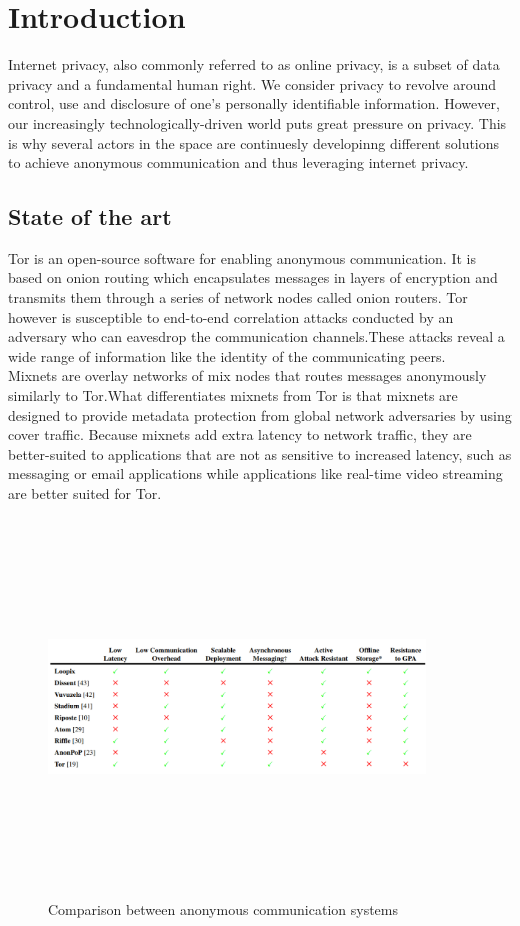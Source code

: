 
\begin{abstract}

\end{abstract}
\section{Introduction}
Internet privacy, also commonly referred to as online privacy, is a subset of data privacy and a fundamental human right. We consider privacy to revolve around control, use and disclosure of one’s personally identifiable information.
However, our increasingly technologically-driven world puts great pressure on privacy. 
This is why several actors in the space are continuesly developinng different solutions to achieve anonymous communication and thus leveraging internet privacy.


\subsection*{State of the art}
Tor is an open-source software for enabling anonymous communication. It is based on onion routing which encapsulates messages in layers of encryption and transmits them through a series of network nodes called onion routers. Tor however is susceptible to end-to-end correlation attacks conducted by an adversary who can eavesdrop the communication channels.These attacks reveal a wide range of information like the identity of the communicating peers.
\\Mixnets are overlay networks of mix nodes that routes messages anonymously similarly to Tor.What differentiates mixnets from Tor is that mixnets are designed to provide metadata protection from global network adversaries by using cover traffic. Because mixnets add extra latency to network traffic, they are better-suited to applications that are not as sensitive to increased latency, such as messaging or email applications while applications like real-time video streaming are better suited for Tor. 
\begin{figure}[H]
    \centering
    \includegraphics[width=10cm,height=10cm,keepaspectratio]{../whitepaper/images/state-of-the-art.png}
    \caption{Comparison between anonymous communication systems}
    \label{fig:Comparison between anonymous communication systems}
\end{figure}
